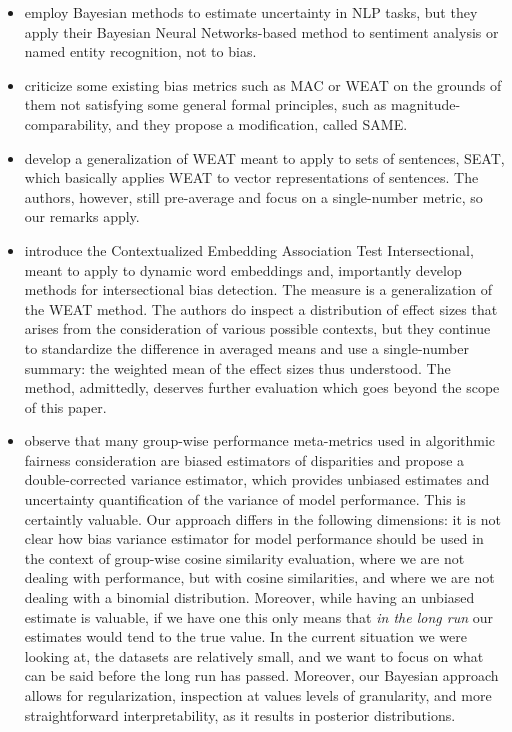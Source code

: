 \documentclass{clv3}
\begin{document}
\begin{itemize}
\item  \citet{xiao2018quantifying} employ Bayesian methods to estimate uncertainty in NLP tasks,
  but they apply their Bayesian Neural Networks-based method to
  sentiment analysis or named entity recognition, not to bias.


\item    \citet{schroder2021evaluating} criticize some existing bias metrics such as \textsf{MAC} or
  \textsf{WEAT} on the grounds of them not satisfying some general
  formal principles, such as magnitude-comparability, and they propose a
  modification, called \textsf{SAME}.

\item \citet{may-etal-2019-measuring} develop a generalization of \textsf{WEAT} meant to apply to
  sets of sentences, \textsf{SEAT}, which basically applies
  \textsf{WEAT} to vector representations of sentences. The authors,
  however, still pre-average and focus on a
  single-number metric, so our remarks apply.

\item \citet{Guo2021CEAT} introduce the Contextualized Embedding Association Test
  Intersectional, meant to apply to dynamic word embeddings and,
  importantly develop methods for intersectional bias detection. The
  measure is a generalization of the WEAT method. The authors do inspect
  a distribution of effect sizes that arises from the consideration of
  various possible contexts, but they continue to standardize the
  difference in averaged means and use a single-number summary: the
  weighted mean of the effect sizes thus understood. The method,
  admittedly, deserves further evaluation which goes beyond the scope of
  this paper.
  
\item \citet{Lum2022Debiasing} observe that many group-wise performance meta-metrics used in algorithmic fairness consideration are biased estimators of disparities and propose a double-corrected variance estimator, which provides unbiased estimates and uncertainty quantification of the variance of model performance. This is certaintly valuable. Our approach differs in the following dimensions: it is not clear how bias variance estimator for model performance should be used in the context of group-wise cosine similarity evaluation, where we are not dealing with performance, but with cosine similarities, and where we are not dealing with a binomial distribution. Moreover, while having an unbiased estimate is valuable, if we have one this only means that \emph{in the long run} our estimates would tend to the true value. In the current situation we were looking at, the datasets are relatively small, and we want to focus on what can be said before the long run has passed. Moreover, our Bayesian approach allows for regularization, inspection at values levels of granularity, and more straightforward interpretability, as it results in posterior distributions.


\end{itemize}
\end{document}
